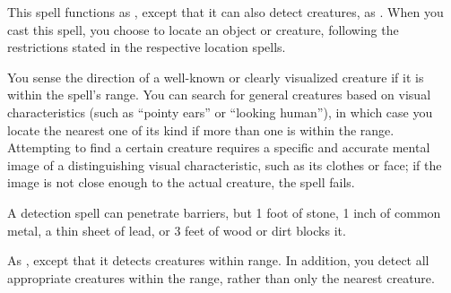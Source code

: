 \begin{spellheader}
\end{spellheader}
\spellrng{\rngext}
\spelldur{\durlong \dismissable}
\spelleffect This spell functions as , except that it can also detect creatures, as . When you cast this spell, you choose to locate an object or creature, following the restrictions stated in the respective location spells.

\begin{spellheader}
    \spellrng{\rnglong}
\end{spellheader}
\begin{spelleffects}
    \spelldur{\durmed \dismissable}
    \spelleffect You sense the direction of a well-known or clearly visualized creature if it is within the spell's range. You can search for general creatures based on visual characteristics (such as ``pointy ears'' or ``looking human''), in which case you locate the nearest one of its kind if more than one is within the range. Attempting to find a certain creature requires a specific and accurate mental image of a distinguishing visual characteristic, such as its clothes or face; if the image is not close enough to the actual creature, the spell fails.
\end{spelleffects}
\begin{spellfooter}
    \spellnotes A detection spell can penetrate barriers, but 1 foot of stone, 1 inch of common metal, a thin sheet of lead, or 3 feet of wood or dirt blocks it.
\end{spellfooter}

\begin{spellheader}
\end{spellheader}
\begin{spelleffects}
    \spellrng{\rngext}
    \spelldur{\durmed \dismissable}
    \spelleffect As , except that it detects creatures within \rngext range. In addition, you detect all appropriate creatures within the range, rather than only the nearest creature.
\end{spelleffects}
\begin{spellfooter}

\end{spellfooter}

